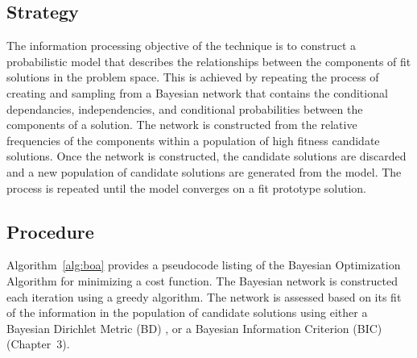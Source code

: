 \subsection{Strategy}
The information processing objective of the technique is to construct a probabilistic model that describes the relationships between the components of fit solutions in the problem space.
This is achieved by repeating the process of creating and sampling from a Bayesian network that contains the conditional dependancies, independencies, and conditional probabilities between the components of a solution. The network is constructed from the relative frequencies of the components within a population of high fitness candidate solutions. Once the network is constructed, the candidate solutions are discarded and a new population of candidate solutions are generated from the model. The process is repeated until the model converges on a fit prototype solution.

\subsection{Procedure}
Algorithm~\ref{alg:boa} provides a pseudocode listing of the Bayesian Optimization Algorithm for minimizing a cost function.
The Bayesian network is constructed each iteration using a greedy algorithm. The network is assessed based on its fit of the information in the population of candidate solutions using either a Bayesian Dirichlet Metric (BD) \cite{Pelikan1999a}, or a Bayesian Information Criterion (BIC) \cite{Pelikan2005} (Chapter~3).

